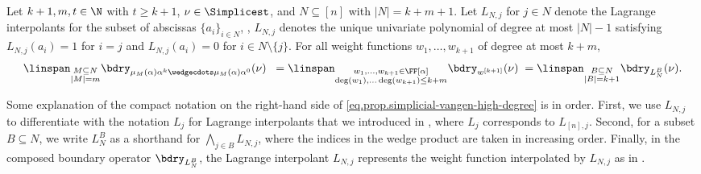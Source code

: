 \begin{proposition}\label{prop.simplicial-vangen-high-degree}
Let \(k+1,m,t \in \N\) with $t \ge k+1$, $\nu \in \Simplicest$, and $N \subseteq [n]$ with $|N|=k+m+1$. Let $L_{N,j}$ for $j \in N$ denote the Lagrange interpolants for the subset of abscissas $\{a_i\}_{i \in N}$, \ie, $L_{N,j}$ denotes the unique univariate polynomial of degree at most $|N|-1$ satisfying $L_{N,j}(a_i)=1$ for $i=j$ and $L_{N,j}(a_i) = 0$ for $i \in N \setminus \{j\}$.
For all weight functions $w_1, \dots, w_{k+1}$ of degree at most $k+m$, 
\begin{equation}\label{eq.prop.simplicial-vangen-high-degree}
\linspan_{\substack{M \subseteq N \\ |M|=m}} \bdry_{\mu_M(\alpha)\alpha^k\wedgecdots\mu_M(\alpha)\alpha^0}(\nu) \; \;
= 
\linspan_{\substack{w_1, \dots, w_{k+1} \in \FF[\alpha] \\ \deg(w_1), \dots \deg(w_{k+1}) \le k+m}}
\bdry_{w^{[k+1]}}(\nu) \;
=
\linspan_{\substack{B \subseteq N \\ |B|=k+1}} \bdry_{L_N^B}(\nu).
\end{equation}
\end{proposition}
Some explanation of the compact notation on the right-hand side of \eqref{eq.prop.simplicial-vangen-high-degree} is in order. First, we use $L_{N,j}$ to differentiate with the notation $L_j$ for Lagrange interpolants that we introduced in , where $L_j$ corresponds to $L_{[n],j}$. Second, for a subset $B \subseteq N$, we write $L_N^B$ as a shorthand for $\bigwedge_{j\in B} L_{N,j}$, where the indices in the wedge product are taken in increasing order. Finally, in the composed boundary operator $\bdry_{L_N^B}$, the Lagrange interpolant $L_{N,j}$ represents the weight function interpolated by $L_{N,j}$ as in 
. 

